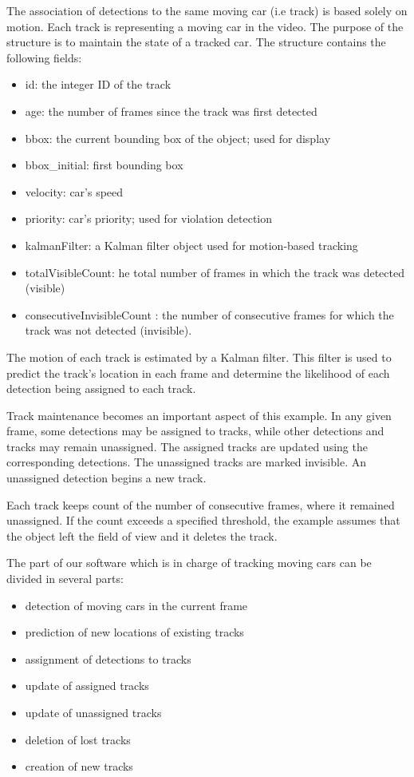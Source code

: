 \documentclass[12pt]{article} %
\begin{document}
The association of detections to the same moving car (i.e track) is based solely on motion. Each track is representing a moving car in the video. The purpose of the structure is to maintain the state of a tracked car. The structure contains the following fields: 
\begin{itemize}
\item id: the integer ID of the track
\item age: the number of frames since the track was first detected
\item bbox: the current bounding box of the object; used for display
\item bbox\_initial: first bounding box
\item velocity: car's speed
\item priority: car's priority; used for violation detection
\item kalmanFilter: a Kalman filter object used for motion-based tracking
\item totalVisibleCount: he total number of frames in which the track was detected (visible)
\item consecutiveInvisibleCount : the number of consecutive frames for which the track was not detected (invisible).
\end{itemize}

The motion of each track is estimated by a Kalman filter. This filter is used to predict the track's location in each frame and determine the likelihood of each detection being assigned to each track.

Track maintenance becomes an important aspect of this example. In any given frame, some detections may be assigned to tracks, while other detections and tracks may remain unassigned. The assigned tracks are updated using the corresponding detections. The unassigned tracks are marked invisible. An unassigned detection begins a new track.

Each track keeps count of the number of consecutive frames, where it remained unassigned. If the count exceeds a specified threshold, the example assumes that the object left the field of view and it deletes the track.

The part of our software which is in charge of tracking moving cars can be divided in several parts:

\begin{itemize}
\item detection of moving cars in the current frame
\item prediction of new locations of existing tracks
\item assignment of detections to tracks
\item update of assigned tracks
\item update of unassigned tracks
\item deletion of lost tracks
\item creation of new tracks
\end{itemize}
\end{document}
